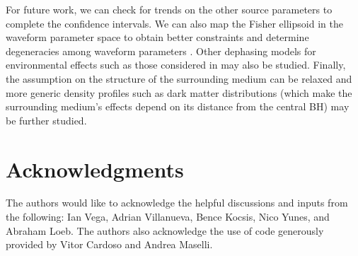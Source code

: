 \documentclass[10pt,a4paper,twoside]{article}
\begin{document}
For future work, we can check for trends on the other source parameters to complete the confidence intervals. We can also map the Fisher ellipsoid in the waveform parameter space to obtain better constraints and determine degeneracies among waveform parameters \cite{Ohme2013}. Other dephasing models for environmental effects such as those considered in \cite{Kocsis2011} may also be studied. Finally, the assumption on the structure of the surrounding medium can be relaxed and more generic density profiles such as dark matter distributions (which make the surrounding medium's effects depend on its distance from the central BH) \cite{Cardoso2020} may be further studied. 

\section*{Acknowledgments}
The authors would like to acknowledge the helpful discussions and inputs from the following: Ian Vega, Adrian Villanueva, Bence Kocsis, Nico Yunes, and Abraham Loeb. The authors also acknowledge the use of code generously provided by Vitor Cardoso and Andrea Maselli.





\end{document}
